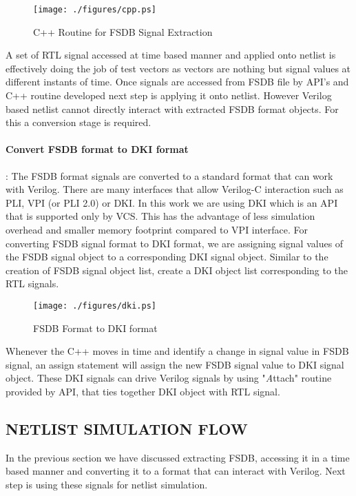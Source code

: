\begin{figure}[h]
\centering
\texttt{[image: ./figures/cpp.ps]}
\caption{C++ Routine for FSDB Signal Extraction}
\label{fig:cpp.eps}
\end{figure}




A set of RTL signal accessed at time based manner and applied onto netlist is effectively doing the job of test vectors as vectors are nothing but signal values at different instants of time.
Once signals are accessed from FSDB file by API's and C++ routine developed next step is applying it onto netlist. However Verilog based netlist cannot directly interact with extracted FSDB format objects. For this a conversion stage is required.  




\paragraph{Convert FSDB format to DKI format}: The FSDB format signals are converted to a standard format that can work with Verilog. There are many interfaces that allow Verilog-C interaction such as PLI, VPI (or PLI 2.0) or DKI. 
In this work we are using DKI which is an API that is supported only by VCS. This has the advantage of less simulation overhead and smaller memory footprint compared to VPI interface.
For converting FSDB signal format to DKI format, we are assigning signal values of the FSDB signal object to a corresponding DKI signal object. Similar to the creation of FSDB signal object list, create a DKI object list corresponding to the RTL signals. 

\begin{figure}[h]
\centering
\texttt{[image: ./figures/dki.ps]}
\caption{FSDB Format to DKI format}
\label{fig:dki.eps}
\end{figure}



Whenever the C++ moves in time and identify a change in signal value in FSDB signal, an assign statement will assign the new FSDB signal value to DKI signal object.  These DKI signals can drive Verilog signals by using "{\emph Attach}" routine provided by API, that ties together DKI object with RTL signal. 

\subsection{NETLIST SIMULATION FLOW}
In the previous section we have discussed extracting FSDB, accessing it in a time based manner and converting it to a format that can interact with Verilog. Next step is using these signals for netlist simulation.



